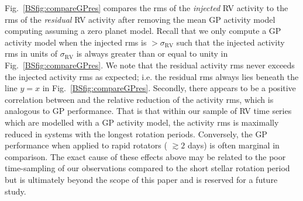 Fig.~\ref{BSfig:compareGPres} compares the rms of the \emph{injected} RV activity to the rms of the \emph{residual} RV activity
after removing the mean GP activity model computing assuming a zero planet model. Recall that we only compute a GP activity model
when the injected rms is $> \sigma_{\text{RV}}$ such that the injected activity rms in units of $\sigma_{\text{RV}}$
is always greater than or equal to unity in Fig.~\ref{BSfig:compareGPres}.
We note that the residual activity rms never exceeds the injected activity rms as expected; i.e. the residual rms
always lies beneath the line $y=x$ in Fig.~\ref{BSfig:compareGPres}. Secondly,
there appears to be a positive correlation between \prot{} and the relative reduction of the activity rms,
which is analogous to GP performance. That is that within our sample of RV time series which are modelled with a GP activity
model, the activity rms is maximally reduced in systems
with the longest rotation periods. Conversely, the GP performance when applied to rapid rotators (\prot{} $\gtrsim 2$ days)
is often marginal in comparison. The exact cause of these effects above may be related to the poor time-sampling of our
observations compared to the short stellar rotation period but is ultimately beyond the scope of this paper and is reserved
for a future study. \\

